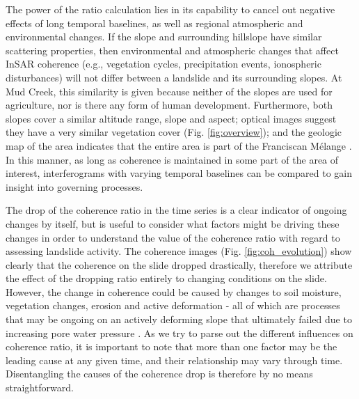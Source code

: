 \documentclass[nhess, manuscript]{copernicus}
\begin{document}
The power of the ratio calculation lies in its capability to cancel out negative effects of long temporal baselines, as well as regional atmospheric and environmental changes. If the slope and surrounding hillslope have similar scattering properties, then environmental and atmospheric changes that affect InSAR coherence (e.g., vegetation cycles, precipitation events, ionospheric disturbances) will not differ between a landslide and its surrounding slopes. At Mud Creek, this similarity is given because neither of the slopes are used for agriculture, nor is there any form of human development. Furthermore, both slopes cover a similar altitude range, slope and aspect; optical images suggest they have a very similar vegetation cover (Fig. \ref{fig:overview}); and the geologic map of the area indicates that the entire area is part of the Franciscan Mélange \citep{californiageologicsurvey}. In this manner, as long as coherence is maintained in some part of the area of interest, interferograms with varying temporal baselines can be compared to gain insight into governing processes. \par


The drop of the coherence ratio in the time series is a clear indicator of ongoing changes by itself, but is useful to consider what factors might be driving these changes in order to understand the value of the coherence ratio with regard to assessing landslide activity. The coherence images (Fig. \ref{fig:coh_evolution}) show clearly that the coherence on the slide dropped drastically, therefore we attribute the effect of the dropping ratio entirely to changing conditions on the slide. However, the change in coherence could be caused by changes to soil moisture, vegetation changes, erosion and active deformation - all of which are processes that may be ongoing on an actively deforming slope that ultimately failed due to increasing pore water pressure \citep{handwerger2019}. As we try to parse out the different influences on coherence ratio, it is important to note that more than one factor may be the leading cause at any given time, and their relationship may vary through time. Disentangling the causes of the coherence drop is therefore by no means straightforward. \par
\end{document}
